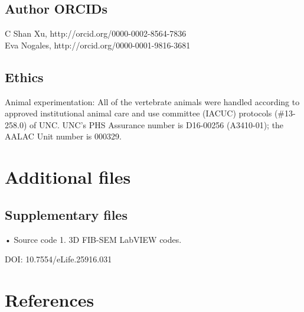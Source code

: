 \documentclass{article}
\begin{document}
\subsection*{Author ORCIDs}

\noindent C Shan Xu, http://orcid.org/0000-0002-8564-7836\\
Eva Nogales, http://orcid.org/0000-0001-9816-3681

\subsection*{Ethics}

Animal experimentation: All of the vertebrate animals were handled according to approved institutional animal care and use committee (IACUC) protocols (\#13-258.0) of UNC. UNC’s PHS Assurance number is D16-00256 (A3410-01); the AALAC Unit number is 000329.

\section*{Additional files}

\subsection*{Supplementary files}

\noindent • Source code 1. 3D FIB-SEM LabVIEW codes.

\noindent DOI: 10.7554/eLife.25916.031

\section*{References}
\end{document}
